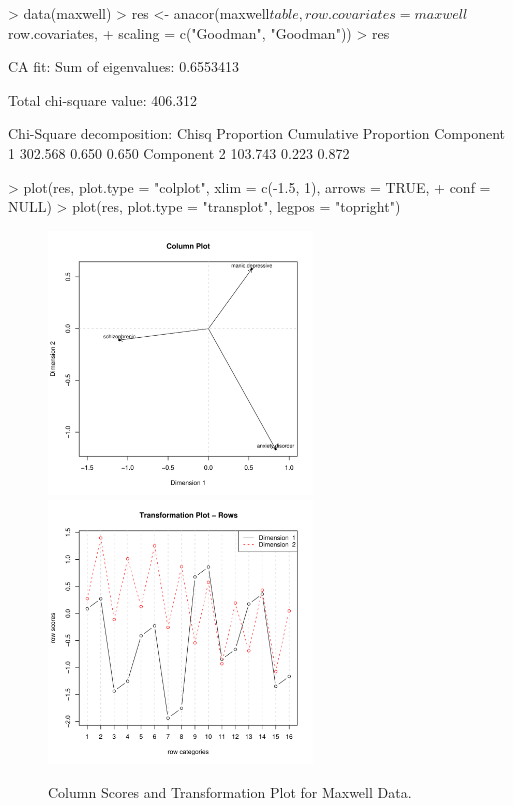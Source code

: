 \documentclass[article]{Z}
\begin{document}
\begin{Schunk}
\begin{Sinput}
> data(maxwell)
> res <- anacor(maxwell$table, row.covariates = maxwell$row.covariates, 
+     scaling = c("Goodman", "Goodman"))
> res
\end{Sinput}
\begin{Soutput}
CA fit: 
Sum of eigenvalues:  0.6553413 

Total chi-square value: 406.312 

Chi-Square decomposition: 
              Chisq Proportion Cumulative Proportion
Component 1 302.568      0.650                 0.650
Component 2 103.743      0.223                 0.872
\end{Soutput}
\end{Schunk}

\begin{Schunk}
\begin{Sinput}
> plot(res, plot.type = "colplot", xlim = c(-1.5, 1), arrows = TRUE, 
+     conf = NULL)
> plot(res, plot.type = "transplot", legpos = "topright")
\end{Sinput}
\end{Schunk}

\begin{figure}[h]
\begin{center}
\includegraphics[height=70mm, width=70mm]{maxcol.pdf}
\includegraphics[height=70mm, width=70mm]{maxtrans.pdf}
\caption{\label{fig:maxwell} Column Scores and Transformation Plot for Maxwell Data.}
\end{center}
\end{figure}
\end{document}

